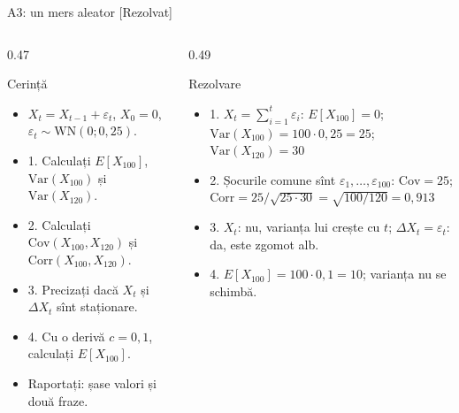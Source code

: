 \begin{frame}{A3: un mers aleator [Rezolvat]}
\itemsize{\scriptsize}
\begin{columns}[T]
\begin{column}{0.47\textwidth}
\begin{block}{Cerință}
\begin{itemize}
    \item $X_t = X_{t-1} + \varepsilon_t$, $X_0 = 0$, $\varepsilon_t \sim \mathrm{WN}(0; 0{,}25)$.
    \item 1. Calculați $E[X_{100}]$, $\mathrm{Var}(X_{100})$ și $\mathrm{Var}(X_{120})$.
    \item 2. Calculați $\mathrm{Cov}(X_{100}, X_{120})$ și $\mathrm{Corr}(X_{100}, X_{120})$.
    \item 3. Precizați dacă $X_t$ și $\Delta X_t$ sînt staționare.
    \item 4. Cu o derivă $c = 0{,}1$, calculați $E[X_{100}]$.
    \item Raportați: șase valori și două fraze.
\end{itemize}
\end{block}
\end{column}
\begin{column}{0.49\textwidth}
\begin{exampleblock}{Rezolvare}
\begin{itemize}
    \item 1. $X_t = \sum_{i=1}^{t}\varepsilon_i$: $E[X_{100}] = 0$; $\mathrm{Var}(X_{100}) = 100 \cdot 0{,}25 = 25$; $\mathrm{Var}(X_{120}) = 30$
    \item 2. Șocurile comune sînt $\varepsilon_1, \dots, \varepsilon_{100}$: $\mathrm{Cov} = 25$; $\mathrm{Corr} = 25/\sqrt{25 \cdot 30} = \sqrt{100/120} = 0{,}913$
    \item 3. $X_t$: nu, varianța lui crește cu $t$; $\Delta X_t = \varepsilon_t$: da, este zgomot alb.
    \item 4. $E[X_{100}] = 100 \cdot 0{,}1 = 10$; varianța nu se schimbă.
\end{itemize}
\end{exampleblock}
\end{column}
\end{columns}
\end{frame}

